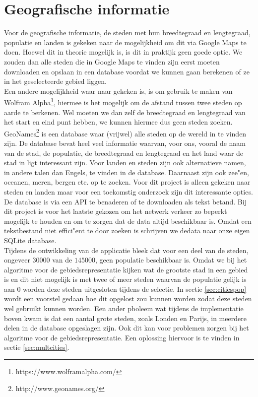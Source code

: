 \documentclass[twoside,openright]{uva-bachelor-thesis}
\begin{document}
	\section{Geografische informatie}
		\label{sec:geo_info}
		Voor de geografische informatie, de steden met hun breedtegraad en lengtegraad, populatie en landen is gekeken naar de mogelijkheid om dit via Google Maps te doen. Hoewel dit in theorie mogelijk is, is dit in praktijk geen goede optie. We zouden dan alle steden die in Google Maps te vinden zijn eerst moeten downloaden en opslaan in een database voordat we kunnen gaan berekenen of ze in het geselecteerde gebied liggen.
		\\[0.5cm]
		Een andere mogelijkheid waar naar gekeken is, is om gebruik te maken van Wolfram Alpha\footnote{https://www.wolframalpha.com/}, hiermee is het mogelijk om de afstand tussen twee steden op aarde te berkenen. Wel moeten we dan zelf de breedtegraad en lengtegraad van het start en eind punt hebben, we kunnen hiermee dus geen steden zoeken.
		\\[0.5cm]
		GeoNames\footnote{http://www.geonames.org/} is een database waar (vrijwel) alle steden op de wereld in te vinden zijn. De database bevat heel veel informatie waarvan, voor ons, vooral de naam van de stad, de populatie, de breedtegraad en lengtegraad en het land waar de stad in ligt interessant zijn. Voor landen en steden zijn ook alternatieve namen, in andere talen dan Engels, te vinden in de database. Daarnaast zijn ook zee"en, oceanen, meren, bergen etc. op te zoeken. Voor dit project is alleen gekeken naar steden en landen maar voor een toekomstig onderzoek zijn dit interessante opties.
		\\[0.5cm]
		De database is via een API te benaderen of te downloaden als tekst betand. Bij dit project is voor het laatste gekozen om het netwerk verkeer zo beperkt mogelijk te houden en om te zorgen dat de data altijd beschikbaar is. Omdat een tekstbestand niet effici"ent te door zoeken is schrijven we dedata naar onze eigen SQLite database.
		\\[0.5cm]
		Tijdens de ontwikkeling van de applicatie bleek dat voor een deel van de steden, ongeveer $30000$ van de $145000$, geen populatie beschikbaar is. Omdat we bij het algoritme voor de gebiedsrepresentatie kijken wat de grootste stad in een gebied is en dit niet mogelijk is met twee of meer steden waarvan de populatie gelijk is aan $0$ worden deze steden uitgesloten tijdens de selectie. In sectie \ref{sec:citiespop} wordt een voorstel gedaan hoe dit opgelost zou kunnen worden zodat deze steden wel gebruikt kunnen worden. Een ander pboleem wat tijdens de implementatie boven kwam is dat een aantal grote steden, zoals Londen en Parijs, in meerdere delen in de database opgeslagen zijn. Ook dit kan voor problemen zorgen bij het algoritme voor de gebiedsrepresentatie. Een oplossing hiervoor is te vinden in sectie \ref{sec:multcities}.
\end{document}
